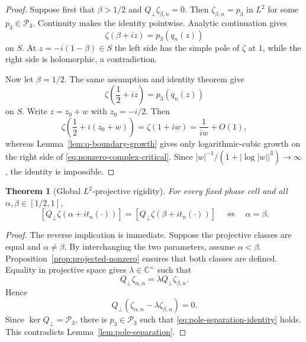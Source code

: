 \documentclass[11pt]{amsart}
\numberwithin{equation}{section}
\newtheorem{theorem}{Theorem}[section]
\newcommand{\C}{\mathbb C}
\newcommand{\Pcal}{\mathcal P}
\begin{document}
\begin{proof}
Suppose first that $\beta>1/2$ and
$Q_\perp\zeta_{\beta,n}=0$.  Then
$\zeta_{\beta,n}=p_3$ in $L^2$ for some $p_3\in\Pcal_3$.
Continuity makes the identity pointwise.  Analytic continuation gives
\begin{equation}
 \zeta(\beta+iz)=p_3(q_n(z))
 \label{eq:nonzero-complex-beta}
\end{equation}
on $S$.  At $z=-i(1-\beta)\in S$ the left side has the simple pole of
$\zeta$ at $1$, while the right side is holomorphic, a contradiction.

Now let $\beta=1/2$.  The same assumption and identity theorem give
\begin{equation}
 \zeta\!\left(\frac12+iz\right)=p_3(q_n(z))
 \label{eq:nonzero-complex-critical}
\end{equation}
on $S$.  Write $z=z_0+w$ with $z_0=-i/2$.  Then
\begin{equation}
 \zeta\!\left(\frac12+i(z_0+w)\right)
 =\zeta(1+iw)=\frac1{iw}+O(1),
 \label{eq:zeta-critical-boundary-pole}
\end{equation}
whereas Lemma~\ref{lem:q-boundary-growth} gives only logarithmic-cubic growth
on the right side of \eqref{eq:nonzero-complex-critical}.  Since
$|w|^{-1}/(1+|\log|w||^3)\to\infty$, the identity is impossible.
\end{proof}

\begin{theorem}[Global $L^2$-projective rigidity]
\label{thm:global-projective-rigidity}
For every fixed phase cell and all $\alpha,\beta\in[1/2,1]$,
\begin{equation}
 \boxed{
 [Q_\perp\zeta(\alpha+i t_n(\cdot))]
 =
 [Q_\perp\zeta(\beta+i t_n(\cdot))]
 \quad\Longleftrightarrow\quad
 \alpha=\beta.
 }
 \label{eq:global-projective-rigidity}
\end{equation}
\end{theorem}

\begin{proof}
The reverse implication is immediate.  Suppose the projective classes are
equal and $\alpha\neq\beta$.  By interchanging the two parameters, assume
$\alpha<\beta$.  Proposition~\ref{prop:projected-nonzero} ensures that both
classes are defined.  Equality in projective space gives
$\lambda\in\C^\times$ such that
\begin{equation}
 Q_\perp\zeta_{\alpha,n}
 =\lambda Q_\perp\zeta_{\beta,n}.
 \label{eq:projective-equality-Q}
\end{equation}
Hence
\begin{equation}
 Q_\perp(\zeta_{\alpha,n}-\lambda\zeta_{\beta,n})=0.
 \label{eq:projective-kernel}
\end{equation}
Since $\ker Q_\perp=\Pcal_3$, there is $p_3\in\Pcal_3$ such that
\eqref{eq:pole-separation-identity} holds.  This contradicts
Lemma~\ref{lem:pole-separation}.
\end{proof}
\end{document}
